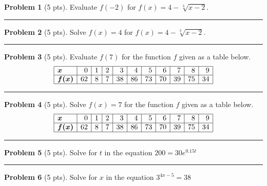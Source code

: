 \documentclass[12pt]{article}
\theoremstyle{definition}
\newtheorem{problem}{Problem}
\begin{document}
\bigskip
\begin{problem}[5 pts]
  Evaluate $f(-2)$ for $f(x) = 4-\sqrt[3]{x-2}$.

  \vspace{2cm}
\end{problem}
\hrule

\begin{problem}[5 pts]
  Solve $f(x)=4$ for $f(x) = 4-\sqrt[3]{x-2}$.

  \vspace{2cm}
\end{problem}
\hrule

\begin{problem}[5 pts]
  Evaluate $f(7)$ for the function $f$ given as a table below.
  \begin{equation*}
    \begin{array}{|l|r|r|r|r|r|r|r|r|r|r|}
      \hline
      \boldsymbol{x} & 0 & 1 & 2 & 3 & 4 & 5 & 6 & 7 & 8 & 9 \\ \hline
      \boldsymbol{f(x)} & 62 & 8 & 7 & 38 & 86 & 73 & 70 & 39 & 75 & 34 \\ \hline
    \end{array}
  \end{equation*}

  \vspace{1cm}
\end{problem}
\hrule

\begin{problem}[5 pts]
  Solve $f(x)=7$ for the function $f$ given as a table below.
  \begin{equation*}
    \begin{array}{|l|r|r|r|r|r|r|r|r|r|r|}
      \hline
      \boldsymbol{x} & 0 & 1 & 2 & 3 & 4 & 5 & 6 & 7 & 8 & 9 \\ \hline
      \boldsymbol{f(x)} & 62 & 8 & 7 & 38 & 86 & 73 & 70 & 39 & 75 & 34 \\ \hline
    \end{array}
  \end{equation*}

  \vspace{1cm}
\end{problem}
\hrule

\begin{problem}[5 pts]
  Solve for $t$ in the equation $200 = 30e^{0.15t}$

  \vspace{4cm}
\end{problem}
\hrule

\begin{problem}[5 pts]
  Solve for $x$ in the equation $3^{4x-5} = 38$

\end{problem}
\end{document}
